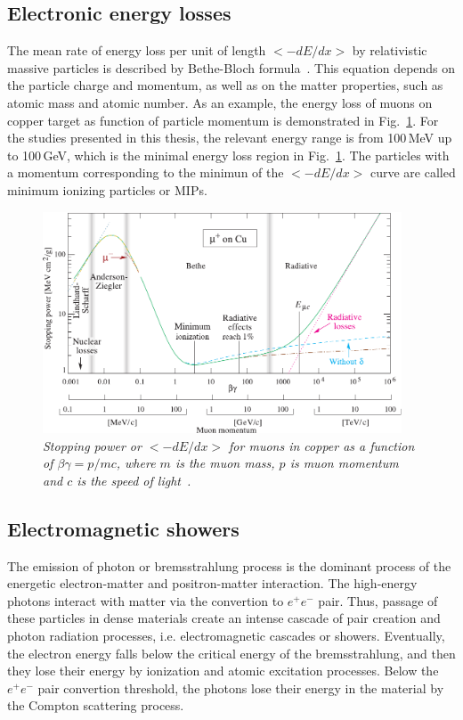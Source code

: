 \subsection{Electronic energy losses} 
The mean rate of energy loss per unit of length $<-dE/dx>$ by relativistic massive particles is described by Bethe-Bloch formula~\cite{bib:PDG}. 
This equation depends on the particle charge and momentum, as well as on the matter properties, such as atomic mass and atomic number. 
As an example, the energy loss of muons on copper target as function of particle momentum is demonstrated in Fig.~\ref{fig:BB_2}.
For the studies presented in this thesis, the relevant energy range is from 100\,MeV up to 100\,GeV, which is the minimal energy loss region in Fig.~\ref{fig:BB_2}.
The particles with a momentum corresponding to the minimun of the  $<-dE/dx>$ curve are called minimum ionizing particles or MIPs. 
\begin{figure}
	\centering
	\includegraphics[width=0.95\textwidth]{ECAL/graphics/rpp_icru49_cu.pdf}
	\caption{\label{fig:BB_2} \sl Stopping power or $<-dE/dx>$  for muons in copper as a function of $\beta\gamma = p/mc$, where $m$ is the muon mass, $p$ is muon momentum and $c$ is the speed of light~\cite{bib:PDG}. }
\end{figure}
\subsection{Electromagnetic showers}
The emission of photon or bremsstrahlung process is the dominant process of the energetic electron-matter and positron-matter interaction.
The high-energy photons interact with matter via the convertion to $e^+e^-$ pair.
Thus, passage of these particles in dense materials create an intense cascade of pair creation and photon radiation processes, i.e. electromagnetic cascades or showers.
Eventually, the electron energy falls below the critical energy of the bremsstrahlung, and then they lose their energy by ionization and atomic excitation processes.
Below the $e^+e^-$ pair convertion threshold, the photons lose their energy in the material by the Compton scattering process. 

